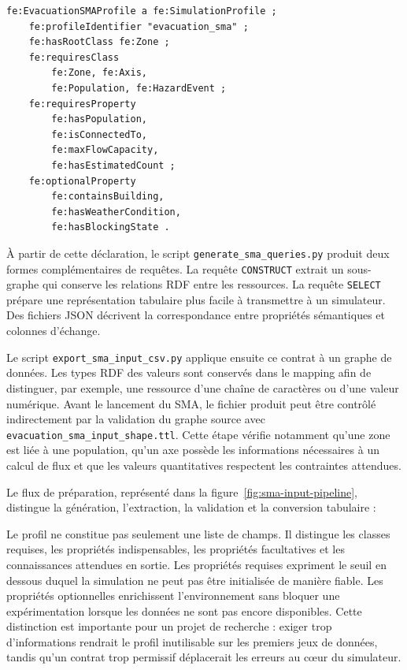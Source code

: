 \documentclass{article}
\begin{document}
\begin{lstlisting}[language=Turtle,caption={Extrait du contrat déclaratif du SMA d'évacuation}]
fe:EvacuationSMAProfile a fe:SimulationProfile ;
    fe:profileIdentifier "evacuation_sma" ;
    fe:hasRootClass fe:Zone ;
    fe:requiresClass
        fe:Zone, fe:Axis,
        fe:Population, fe:HazardEvent ;
    fe:requiresProperty
        fe:hasPopulation,
        fe:isConnectedTo,
        fe:maxFlowCapacity,
        fe:hasEstimatedCount ;
    fe:optionalProperty
        fe:containsBuilding,
        fe:hasWeatherCondition,
        fe:hasBlockingState .
\end{lstlisting}

À partir de cette déclaration, le script \texttt{generate\_sma\_queries.py} produit deux formes complémentaires de requêtes. La requête \texttt{CONSTRUCT} extrait un sous-graphe qui conserve les relations RDF entre les ressources. La requête \texttt{SELECT} prépare une représentation tabulaire plus facile à transmettre à un simulateur. Des fichiers JSON décrivent la correspondance entre propriétés sémantiques et colonnes d'échange.

Le script \texttt{export\_sma\_input\_csv.py} applique ensuite ce contrat à un graphe de données. Les types RDF des valeurs sont conservés dans le mapping afin de distinguer, par exemple, une ressource d'une chaîne de caractères ou d'une valeur numérique. Avant le lancement du SMA, le fichier produit peut être contrôlé indirectement par la validation du graphe source avec \texttt{evacuation\_sma\_input\_shape.ttl}. Cette étape vérifie notamment qu'une zone est liée à une population, qu'un axe possède les informations nécessaires à un calcul de flux et que les valeurs quantitatives respectent les contraintes attendues.

Le flux de préparation, représenté dans la figure~\ref{fig:sma-input-pipeline}, distingue la génération, l'extraction, la validation et la conversion tabulaire :

Le profil ne constitue pas seulement une liste de champs. Il distingue les classes requises, les propriétés indispensables, les propriétés facultatives et les connaissances attendues en sortie. Les propriétés requises expriment le seuil en dessous duquel la simulation ne peut pas être initialisée de manière fiable. Les propriétés optionnelles enrichissent l'environnement sans bloquer une expérimentation lorsque les données ne sont pas encore disponibles. Cette distinction est importante pour un projet de recherche : exiger trop d'informations rendrait le profil inutilisable sur les premiers jeux de données, tandis qu'un contrat trop permissif déplacerait les erreurs au cœur du simulateur.
\end{document}
